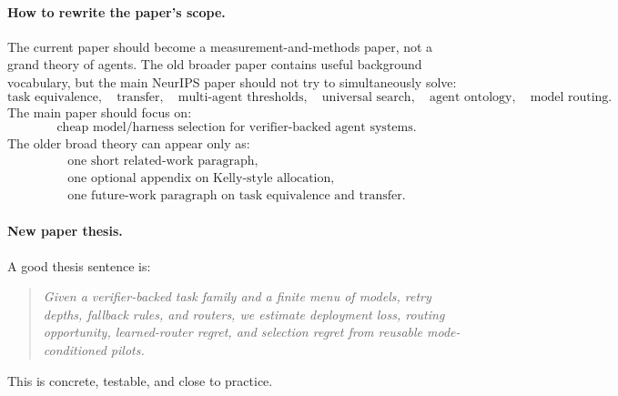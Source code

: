 \documentclass{article}
\begin{document}
\paragraph{How to rewrite the paper's scope.}
The current paper should become a measurement-and-methods paper, not a grand theory of
agents.
The old broader paper contains useful background vocabulary, but the main NeurIPS paper
should not try to simultaneously solve:
\[
    \text{task equivalence},\quad
    \text{transfer},\quad
    \text{multi-agent thresholds},\quad
    \text{universal search},\quad
    \text{agent ontology},\quad
    \text{model routing}.
\]
The main paper should focus on:
\[
    \boxed{
    \text{cheap model/harness selection for verifier-backed agent systems.}
    }
\]
The older broad theory can appear only as:
\[
\begin{array}{ll}
    \text{one short related-work paragraph},\\
    \text{one optional appendix on Kelly-style allocation},\\
    \text{one future-work paragraph on task equivalence and transfer}.
\end{array}
\]

\paragraph{New paper thesis.}
A good thesis sentence is:
\begin{quote}
\itshape
Given a verifier-backed task family and a finite menu of models, retry depths,
fallback rules, and routers, we estimate deployment loss, routing opportunity,
learned-router regret, and selection regret from reusable mode-conditioned pilots.
\end{quote}
This is concrete, testable, and close to practice.
\end{document}
